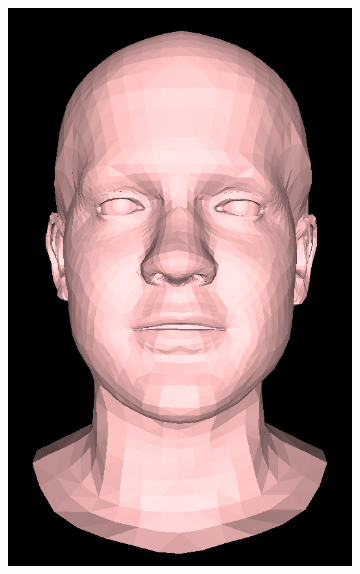 \begin{figure}[h!]
\begin{subfigure}[b]{0.19\textwidth}
        \includegraphics[width=\textwidth]{figures/gen_sample/00023.png}
    \end{subfigure}
    \begin{subfigure}[b]{0.19\textwidth}

\end{subfigure}
\end{figure}
